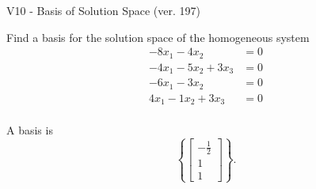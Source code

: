 \begin{exercise}
  \begin{exerciseTitle}V10 - Basis of Solution Space (ver. 197)\end{exerciseTitle}
  \begin{exerciseStatement}
    Find a basis for the solution space of the homogeneous system 
\begin{align*}
 -8 x_ 1 -4 x_ 2 &= 0  \\ 
  -4 x_ 1 -5 x_ 2 + 3 x_ 3 &= 0  \\ 
  -6 x_ 1 -3 x_ 2 &= 0  \\ 
  4 x_ 1 -1 x_ 2 + 3 x_ 3 &= 0  \\ 
 \end{align*}


 
  \end{exerciseStatement}

  \begin{exerciseAnswer}
   A basis is   
\[\left\{\left[\begin{array}{c}
-\frac{1}{2} \\
1 \\
1
\end{array}\right]\right\}.\]

  


  \end{exerciseAnswer}
\end{exercise}